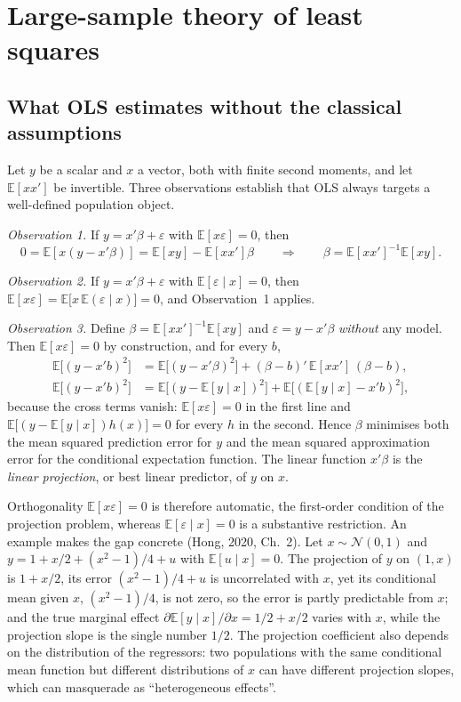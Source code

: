 \documentclass[11pt,a4paper]{article}
\newcommand{\E}{\mathbb{E}}
\newcommand{\N}{\mathcal{N}}
\begin{document}
\section{Large-sample theory of least squares}\label{sec:ols_asy}

\subsection{What OLS estimates without the classical assumptions}

Let $y$ be a scalar and $x$ a vector, both with finite second moments, and let $\E[xx']$ be invertible. Three observations establish that OLS always targets a well-defined population object.

\emph{Observation 1.} If $y=x'\beta+\varepsilon$ with $\E[x\varepsilon]=0$, then
\[
0=\E[x(y-x'\beta)]=\E[xy]-\E[xx']\beta\qquad\Longrightarrow\qquad\beta=\E[xx']^{-1}\E[xy].
\]

\emph{Observation 2.} If $y=x'\beta+\varepsilon$ with $\E[\varepsilon\mid x]=0$, then $\E[x\varepsilon]=\E\big[x\,\E(\varepsilon\mid x)\big]=0$, and Observation~1 applies.

\emph{Observation 3.} Define $\beta=\E[xx']^{-1}\E[xy]$ and $\varepsilon=y-x'\beta$ \emph{without} any model. Then $\E[x\varepsilon]=0$ by construction, and for every $b$,
\begin{align*}
\E\big[(y-x'b)^2\big]&=\E\big[(y-x'\beta)^2\big]+(\beta-b)'\,\E[xx']\,(\beta-b),\\
\E\big[(y-x'b)^2\big]&=\E\big[(y-\E[y\mid x])^2\big]+\E\big[(\E[y\mid x]-x'b)^2\big],
\end{align*}
because the cross terms vanish: $\E[x\varepsilon]=0$ in the first line and $\E\big[(y-\E[y\mid x])h(x)\big]=0$ for every $h$ in the second. Hence $\beta$ minimises both the mean squared prediction error for $y$ and the mean squared approximation error for the conditional expectation function. The linear function $x'\beta$ is the \emph{linear projection}, or best linear predictor, of $y$ on $x$.

Orthogonality $\E[x\varepsilon]=0$ is therefore automatic, the first-order condition of the projection problem, whereas $\E[\varepsilon\mid x]=0$ is a substantive restriction. An example makes the gap concrete (Hong, 2020, Ch.~2). Let $x\sim\N(0,1)$ and $y=1+x/2+(x^2-1)/4+u$ with $\E[u\mid x]=0$. The projection of $y$ on $(1,x)$ is $1+x/2$, its error $(x^2-1)/4+u$ is uncorrelated with $x$, yet its conditional mean given $x$, $(x^2-1)/4$, is not zero, so the error is partly predictable from $x$; and the true marginal effect $\partial\E[y\mid x]/\partial x=1/2+x/2$ varies with $x$, while the projection slope is the single number $1/2$. The projection coefficient also depends on the distribution of the regressors: two populations with the same conditional mean function but different distributions of $x$ can have different projection slopes, which can masquerade as ``heterogeneous effects''.
\end{document}
